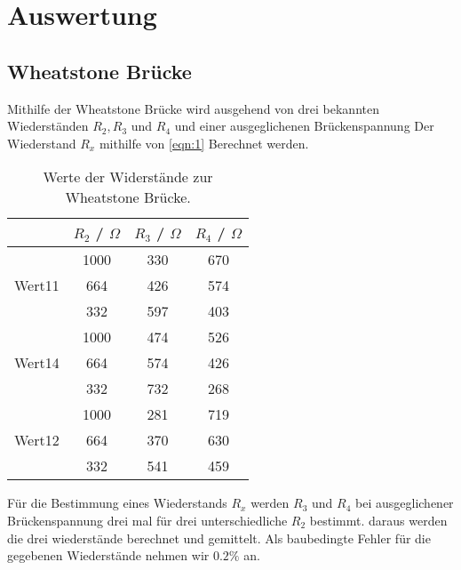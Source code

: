 \section{Auswertung}
\label{sec:Auswertung}

\subsection{Wheatstone Brücke}
Mithilfe der Wheatstone Brücke wird ausgehend von drei 
bekannten Wiederständen $R_2, R_3 $ und $R_4$ und einer ausgeglichenen Brückenspannung 
Der Wiederstand $R_x$ mithilfe von \autoref{eqn:1} Berechnet werden. 
\begin{table}[H]
    \centering
    \caption{Werte der Widerstände zur Wheatstone Brücke.}
    \label{tab:t1}
    \begin{tabular}{|l|c|c|c|}
        \hline
        & \textbf{$R_2$ / $\Omega$} & \textbf{$R_3$ / $\Omega$} & \textbf{$R_4$ / $\Omega$} \\
        \hline
        \hline
               & 1000 & 330 & 670 \\
        Wert11 & 664  & 426 & 574 \\
               & 332  & 597 & 403 \\
        \hline
        \hline
               & 1000 & 474 & 526 \\
        Wert14 & 664  & 574 & 426 \\
               & 332  & 732 & 268 \\
        \hline
        \hline
               & 1000 & 281 & 719 \\
        Wert12 & 664  & 370 & 630 \\
               & 332  & 541 & 459 \\
        \hline
    \end{tabular}
\end{table}
Für die Bestimmung eines Wiederstands $R_x$ werden $R_3$ und $R_4$ bei ausgeglichener Brückenspannung drei 
mal für drei unterschiedliche $R_2$ bestimmt. daraus werden die drei wiederstände berechnet und gemittelt.
Als baubedingte Fehler für die gegebenen Wiederstände nehmen wir $0.2\% $ an.

